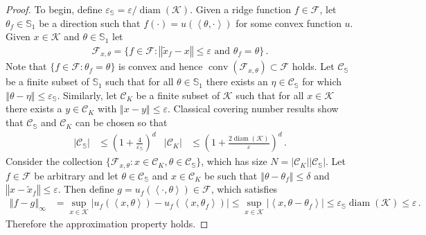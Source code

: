 \documentclass[letter, 12pt]{report}
\newcommand{\ip}[1]{\left \langle #1 \right \rangle}
\newcommand{\sphere}{\mathbb{S}}
\newcommand{\norm}[1]{\left \Vert  #1 \right \Vert}
\newcommand{\cK}{\mathcal K}
\newcommand{\cC}{\mathcal C}
\newcommand{\sF}{\mathscr F}
\newcommand{\conv}{\operatorname{conv}}
\newcommand{\diam}{\operatorname{diam}}
\newcommand{\1}{\mathbf{1}}
\renewcommand{\epsilon}{\varepsilon}
\theoremstyle{plain}
\theoremstyle{definition}
\theoremstyle{remark}
\begin{document}
\begin{proof}
    To begin, define $\epsilon_{\mathbb S} = \epsilon/\diam(\cK)$.
    Given a ridge function $f \in \sF$, let $\theta_f \in \sphere_1$ be a direction such that $f(\cdot) = u(\ip{\theta, \cdot})$ for some convex function $u$.
    Given $x \in \cK$ and $\theta \in \sphere_1$ let
    \begin{align*}
        \sF_{x,\theta} = \{f \in \sF : \norm{\tilde x_f - x} \leq \epsilon \text{ and } \theta_f = \theta\} \,.
    \end{align*}
    Note that $\{f \in \sF : \theta_f = \theta\}$ is convex and hence $\conv(\sF_{x,\theta}) \subset \sF$ holds.
    Let $\cC_{\mathbb S}$ be a finite subset of $\sphere_1$ such that for all $\theta \in \sphere_1$ there exists an $\eta \in \cC_{\mathbb S}$
    for which $\norm{\theta - \eta} \leq \epsilon_{\mathbb S}$.
    Similarly, let $\cC_K$ be a finite subset of $\cK$ such that for all $x \in \cK$ there exists a $y \in \cC_K$ with $\norm{x - y} \leq \epsilon$.
    Classical covering number results \citep[\S4]{ASG15} show that $\cC_{\mathbb S}$ and $\cC_K$ can be chosen so that
    \begin{align*}
        |\cC_{\mathbb S}| & \leq \left(1 + \frac{4}{\epsilon_{\mathbb S}}\right)^d    &
        |\cC_K|           & \leq \left(1 + \frac{2 \diam(\cK)}{\epsilon}\right)^d \,.
    \end{align*}
    Consider the collection $\{\sF_{x,\theta} : x \in \cC_K, \theta \in \cC_{\mathbb S}\}$, which has size $N = |\cC_K| |\cC_{\mathbb S}|$.
    Let $f \in \sF$ be arbitrary and let $\theta \in \cC_{\mathbb S}$ and $x \in \cC_K$ be such that
    $\norm{\theta - \theta_f} \leq \delta$ and $\norm{x - \tilde x_f} \leq \epsilon$.
    Then define $g = u_f(\ip{\cdot, \theta}) \in \sF$, which satisfies
    \begin{align*}
        \norm{f - g}_\infty
         & = \sup_{x \in \cK} |u_f(\ip{x, \theta}) - u_f(\ip{x, \theta_f})|
        \leq \sup_{x \in \cK} |\ip{x, \theta - \theta_f}|
        \leq \epsilon_{\mathbb S} \diam(\cK)
        \leq \epsilon \,.
    \end{align*}
    Therefore the approximation property holds.
\end{proof}
\end{document}
